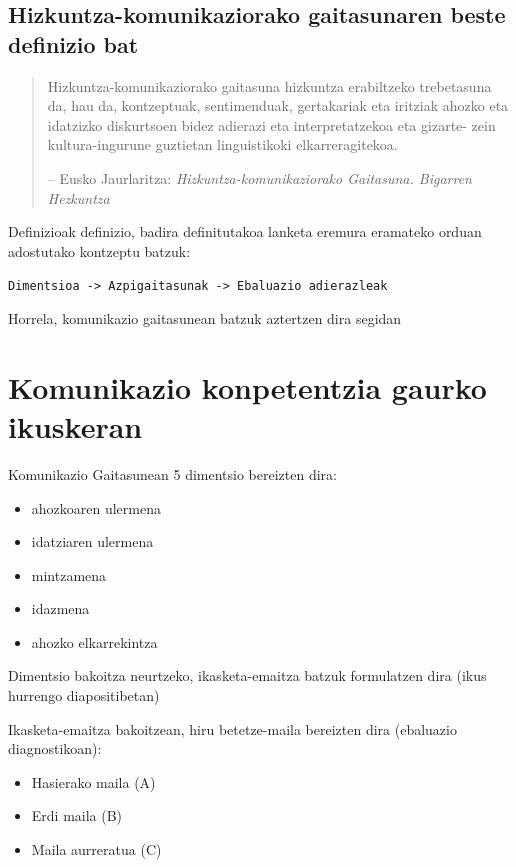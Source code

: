 \documentclass[
]{book}
\providecommand{\tightlist}{%
  \setlength{\itemsep}{0pt}\setlength{\parskip}{0pt}}
\begin{document}
\hypertarget{hizkuntza-komunikaziorako-gaitasunaren-beste-definizio-bat}{%
\subsection{Hizkuntza-komunikaziorako gaitasunaren beste definizio bat}\label{hizkuntza-komunikaziorako-gaitasunaren-beste-definizio-bat}}

\begin{quote}
Hizkuntza-komunikaziorako gaitasuna hizkuntza erabiltzeko trebetasuna da, hau da, kontzeptuak, sentimenduak, gertakariak eta iritziak ahozko eta idatzizko diskurtsoen bidez adierazi eta interpretatzekoa eta gizarte- zein kultura-ingurune guztietan linguistikoki elkarreragitekoa.

-- Eusko Jaurlaritza: \emph{Hizkuntza-komunikaziorako Gaitasuna. Bigarren Hezkuntza}
\end{quote}

Definizioak definizio, badira definitutakoa lanketa eremura eramateko orduan adostutako kontzeptu batzuk:

\texttt{Dimentsioa\ -\textgreater{}\ Azpigaitasunak\ -\textgreater{}\ Ebaluazio\ adierazleak}

Horrela, komunikazio gaitasunean batzuk aztertzen dira segidan

\hypertarget{komunikazio-konpetentzia-gaurko-ikuskeran}{%
\section{Komunikazio konpetentzia gaurko ikuskeran}\label{komunikazio-konpetentzia-gaurko-ikuskeran}}

Komunikazio Gaitasunean 5 dimentsio bereizten dira:

\begin{itemize}
\item
  ahozkoaren ulermena
\item
  idatziaren ulermena
\item
  mintzamena
\item
  idazmena
\item
  ahozko elkarrekintza
\end{itemize}

Dimentsio bakoitza neurtzeko, ikasketa-emaitza batzuk formulatzen dira (ikus hurrengo diapositibetan)

Ikasketa-emaitza bakoitzean, hiru betetze-maila bereizten dira (ebaluazio diagnostikoan):

\begin{itemize}
\tightlist
\item
  Hasierako maila (A)
\item
  Erdi maila (B)
\item
  Maila aurreratua (C)
\end{itemize}
\end{document}
